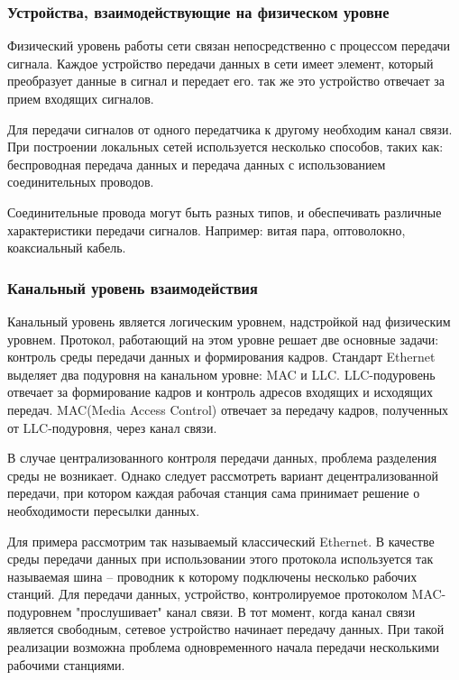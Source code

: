     \subsubsection{Устройства, взаимодействующие на физическом уровне}

    Физический уровень работы сети связан непосредственно с процессом передачи сигнала. Каждое устройство передачи данных в сети имеет элемент, который преобразует данные в сигнал и передает его. так же это устройство отвечает за прием входящих сигналов.

    Для передачи сигналов от одного передатчика к другому необходим канал связи. При построении локальных сетей используется несколько способов, таких как: беспроводная передача данных и передача данных с использованием соединительных проводов.

    Соединительные провода могут быть разных типов, и обеспечивать различные характеристики передачи сигналов. Например: витая пара, оптоволокно, коаксиальный кабель.

    \subsubsection{Канальный уровень взаимодействия }

    Канальный уровень является логическим уровнем, надстройкой над физическим уровнем. Протокол, работающий на этом уровне решает две основные задачи: контроль среды передачи данных и формирования кадров. Стандарт Ethernet выделяет два подуровня на канальном уровне: MAC и LLC. LLC-подуровень отвечает за формирование кадров и контроль адресов входящих и исходящих передач. MAC(Media Access Control) отвечает за передачу кадров, полученных от LLC-подуровня, через канал связи.

    В случае централизованного контроля передачи данных, проблема разделения среды не возникает. Однако следует рассмотреть вариант децентрализованной передачи, при котором каждая рабочая станция сама принимает решение о необходимости пересылки данных.

    Для примера рассмотрим так называемый классический Ethernet. В качестве среды передачи данных при использовании этого протокола используется так называемая шина -- проводник к которому подключены несколько рабочих станций. Для передачи данных, устройство, контролируемое протоколом MAC-подуровнем "прослушивает" канал связи. В тот момент, когда канал связи является свободным, сетевое устройство начинает передачу данных. При такой реализации возможна проблема одновременного начала передачи несколькими рабочими станциями.

